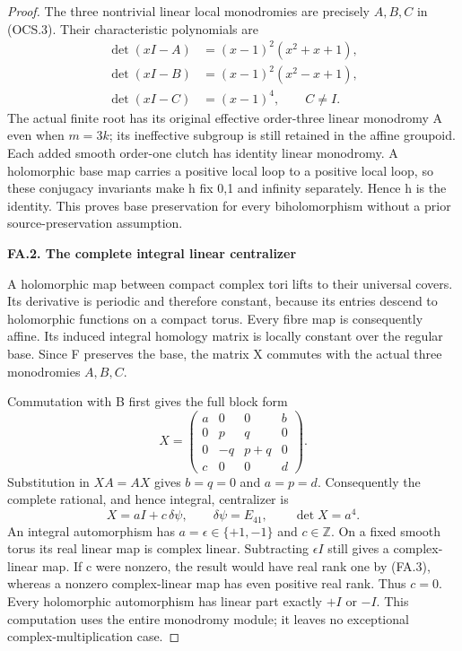 \begin{proof}
The three nontrivial linear local monodromies are precisely \(A,B,C\) in
(OCS.3). Their characteristic polynomials are
\[
 \begin{aligned}
 \det(xI-A)&=(x-1)^2(x^2+x+1),\\
 \det(xI-B)&=(x-1)^2(x^2-x+1),\\
 \det(xI-C)&=(x-1)^4,\qquad C\ne I .
 \end{aligned}                                           \tag{FA.2}
\]
The actual finite root has its original effective order-three linear
monodromy A even when \(m=3k\); its ineffective subgroup is still retained in
the affine groupoid. Each added smooth order-one clutch has identity
linear monodromy. A holomorphic base map carries a positive local loop to
a positive local loop, so these conjugacy invariants make h fix 0,1 and
infinity separately. Hence h is the identity. This proves base preservation
for every biholomorphism without a prior source-preservation assumption.

\par

\medskip\noindent\textbf{FA.2. The complete integral linear centralizer}

\par\nobreak

A holomorphic map between compact complex tori lifts to their universal
covers. Its derivative is periodic and therefore constant, because its
entries descend to holomorphic functions on a compact torus. Every fibre
map is consequently affine. Its induced integral homology matrix is
locally constant over the regular base. Since F preserves the base, the
matrix X commutes with the actual three monodromies \(A,B,C\).

Commutation with B first gives the full block form
\[
 X=\begin{pmatrix}
 a&0&0&b\\0&p&q&0\\0&-q&p+q&0\\c&0&0&d
 \end{pmatrix}.
\]
Substitution in \(XA=AX\) gives \(b=q=0\) and \(a=p=d\). Consequently the complete
rational, and hence integral, centralizer is
\[
                  X=aI+c\,\delta\psi,
       \qquad \delta\psi=E_{41},\qquad \det X=a^4.       \tag{FA.3}
\]
An integral automorphism has \(a=\epsilon\in\{+1,-1\}\) and \(c\in\mathbb Z\). On a fixed
smooth torus its real linear map is complex linear. Subtracting
\(\epsilon I\) still gives a complex-linear map. If c were nonzero, the
result would have real rank one by (FA.3), whereas a nonzero complex-linear
map has even positive real rank. Thus \(c=0\). Every holomorphic automorphism
has linear part exactly \(+I\) or \(-I\). This computation uses the entire
monodromy module; it leaves no exceptional complex-multiplication case.


\end{proof}
